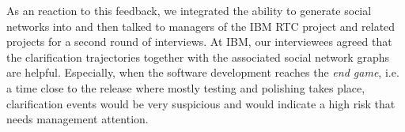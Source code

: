 As an reaction to this feedback, we integrated the ability to generate social networks into \viss and then  talked to managers of the IBM RTC project and related projects for a second round of interviews.
At IBM, our interviewees agreed that the clarification trajectories together with the associated social network graphs are helpful. 
Especially, when the software development reaches the \emph{end game}, i.e. a time close to the release where mostly testing and polishing takes place, clarification events would be very suspicious and would indicate a high risk that needs management attention. 
